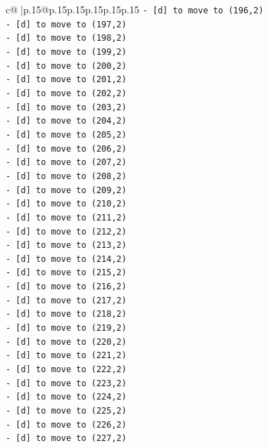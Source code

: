\documentclass{article}
\begin{document}
{\begin{supertabular}{c@{$\;$}|p{.15\linewidth}@{}p{.15\linewidth}p{.15\linewidth}p{.15\linewidth}p{.15\linewidth}p{.15\linewidth}}
{{{\texttt{{-} {[}d{]} to move to (196,2)} \\
\texttt{{-} {[}d{]} to move to (197,2)} \\
\texttt{{-} {[}d{]} to move to (198,2)} \\
\texttt{{-} {[}d{]} to move to (199,2)} \\
\texttt{{-} {[}d{]} to move to (200,2)} \\
\texttt{{-} {[}d{]} to move to (201,2)} \\
\texttt{{-} {[}d{]} to move to (202,2)} \\
\texttt{{-} {[}d{]} to move to (203,2)} \\
\texttt{{-} {[}d{]} to move to (204,2)} \\
\texttt{{-} {[}d{]} to move to (205,2)} \\
\texttt{{-} {[}d{]} to move to (206,2)} \\
\texttt{{-} {[}d{]} to move to (207,2)} \\
\texttt{{-} {[}d{]} to move to (208,2)} \\
\texttt{{-} {[}d{]} to move to (209,2)} \\
\texttt{{-} {[}d{]} to move to (210,2)} \\
\texttt{{-} {[}d{]} to move to (211,2)} \\
\texttt{{-} {[}d{]} to move to (212,2)} \\
\texttt{{-} {[}d{]} to move to (213,2)} \\
\texttt{{-} {[}d{]} to move to (214,2)} \\
\texttt{{-} {[}d{]} to move to (215,2)} \\
\texttt{{-} {[}d{]} to move to (216,2)} \\
\texttt{{-} {[}d{]} to move to (217,2)} \\
\texttt{{-} {[}d{]} to move to (218,2)} \\
\texttt{{-} {[}d{]} to move to (219,2)} \\
\texttt{{-} {[}d{]} to move to (220,2)} \\
\texttt{{-} {[}d{]} to move to (221,2)} \\
\texttt{{-} {[}d{]} to move to (222,2)} \\
\texttt{{-} {[}d{]} to move to (223,2)} \\
\texttt{{-} {[}d{]} to move to (224,2)} \\
\texttt{{-} {[}d{]} to move to (225,2)} \\
\texttt{{-} {[}d{]} to move to (226,2)} \\
\texttt{{-} {[}d{]} to move to (227,2)} \\
}}}
\end{supertabular}}
\end{document}
